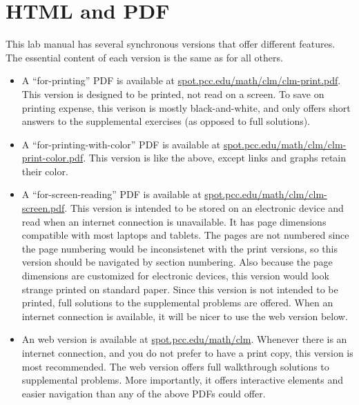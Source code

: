 \documentclass[10pt,oneside,]{book}
\theoremstyle{plain}
\theoremstyle{definition}
\numberwithin{equation}{section}
\begin{document}
\chapter*{HTML and PDF}\label{versions}
This lab manual has several synchronous versions that offer different features. The essential content of each version is the same as for all others.%
\begin{itemize}[label=\textbullet]
\item{}A ``for-printing'' PDF is available at \url{spot.pcc.edu/math/clm/clm-print.pdf}. This version is designed to be printed, not read on a screen. To save on printing expense, this verison is mostly black-and-white, and only offers short answers to the supplemental exercises (as opposed to full solutions).%
\item{}A ``for-printing-with-color'' PDF is available at \url{spot.pcc.edu/math/clm/clm-print-color.pdf}. This version is like the above, except links and graphs retain their color.%
\item{}A ``for-screen-reading'' PDF is available at \url{spot.pcc.edu/math/clm/clm-screen.pdf}. This version is intended to be stored on an electronic device and read when an internet connection is unavailable. It has page dimensions compatible with most laptops and tablets. The pages are not numbered since the page numbering would be inconsistenet with the print versions, so this version should be navigated by section numbering. Also because the page dimensions are customized for electronic devices, this version would look strange printed on standard paper. Since this version is not intended to be printed, full solutions to the supplemental problems are offered. When an internet connection is available, it will be nicer to use the web version below.%
\item{}An web version is available at \url{spot.pcc.edu/math/clm}. Whenever there is an internet connection, and you do not prefer to have a print copy, this version is most recommended. The web version offers full walkthrough solutions to supplemental problems. More importantly, it offers interactive elements and easier navigation than any of the above PDFs could offer.%
\end{itemize}
\end{document}
